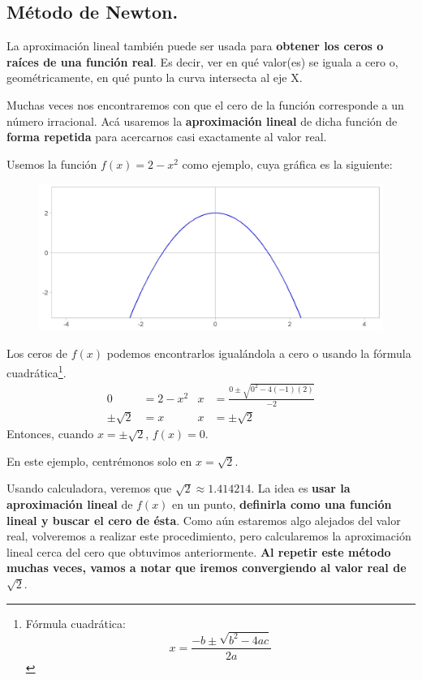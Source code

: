 \documentclass[12pt]{article}
\begin{document}
\subsection{Método de Newton.}

La aproximación lineal también puede ser usada para \textbf{obtener los ceros o raíces de una función real}. Es decir, ver en qué valor(es) se iguala a cero o, geométricamente, en qué punto la curva intersecta al eje X.

Muchas veces nos encontraremos con que el cero de la función corresponde a un número irracional. Acá usaremos la \textbf{aproximación lineal} de dicha función de \textbf{forma repetida} para acercarnos casi exactamente al valor real.

Usemos la función $f(x) = 2 - x^{2}$ como ejemplo, cuya gráfica es la siguiente:

\newpage

\begin{figure}[hbt!]
\centering
\includegraphics[scale=0.7]{img/newton_general_plot.jpg}
\end{figure}

Los ceros de $f(x)$ podemos encontrarlos igualándola a cero o usando la fórmula cuadrática\footnote{Fórmula cuadrática: \[x = \frac{-b \pm \sqrt{b^{2} - 4ac}}{2a}\]}.
\begin{align*}
0 &= 2 - x^{2} & x &= \frac{0 \pm \sqrt{0^{2} - 4(-1)(2)}}{-2} \\
\pm \sqrt{2} &= x & x &= \pm \sqrt{2}
\end{align*}
Entonces, cuando $x = \pm\sqrt{2}$, $f(x) = 0$.

En este ejemplo, centrémonos solo en $x = \sqrt{2}$.

Usando calculadora, veremos que $\sqrt{2} \approx 1.414214$. La idea es \textbf{usar la aproximación lineal} de $f(x)$ en un punto, \textbf{definirla como una función lineal y buscar el cero de ésta}. Como aún estaremos algo alejados del valor real, volveremos a realizar este procedimiento, pero calcularemos la aproximación lineal cerca del cero que obtuvimos anteriormente. \textbf{Al repetir este método muchas veces, vamos a notar que iremos convergiendo al valor real de} $\sqrt{2}$.
\end{document}

